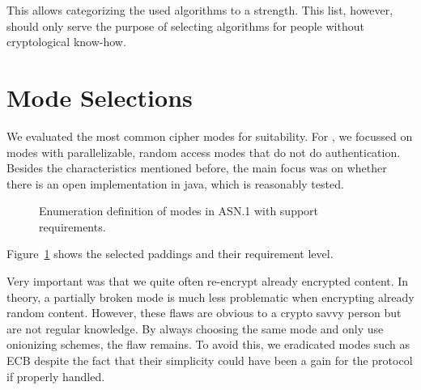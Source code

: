 This allows categorizing the used algorithms to a strength. This list, however, should only serve the purpose of selecting algorithms for people without cryptological know-how.

\section{Mode Selections}\label{sec:modeSelection}
We evaluated the most common cipher modes for suitability. For \MessageVortex, we focussed on modes with parallelizable, random access modes that do not do authentication. Besides the characteristics mentioned before, the main focus was on whether there is an open implementation in java, which is reasonably tested.

\begin{figure}[ht]
	
	\caption{Enumeration definition of modes in ASN.1 with support requirements.}
	\label{fig:defModes}
\end{figure}

Figure~\ref{fig:defModes} shows the selected paddings and their requirement level.

Very important was that we quite often re-encrypt already encrypted content. In theory, a partially broken mode is much less problematic when encrypting already random content. However, these flaws are obvious to a crypto savvy person but are not regular knowledge. By always choosing the same mode and only use onionizing schemes, the flaw remains. To avoid this, we eradicated modes such as ECB despite the fact that their simplicity could have been a gain for the protocol if properly handled.

